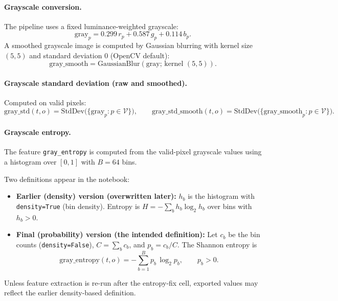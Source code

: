 \paragraph{Grayscale conversion.}
The pipeline uses a fixed luminance-weighted grayscale:
\begin{equation}
\mathrm{gray}_p = 0.299\,r_p + 0.587\,g_p + 0.114\,b_p.
\end{equation}
A smoothed grayscale image is computed by Gaussian blurring with kernel size $(5,5)$ and standard deviation $0$ (OpenCV default):
\begin{equation}
\mathrm{gray\_smooth} = \mathrm{GaussianBlur}(\mathrm{gray};\,\text{kernel }(5,5)).
\end{equation}

\paragraph{Grayscale standard deviation (raw and smoothed).}
Computed on valid pixels:
\begin{equation}
\mathrm{gray\_std}(t,o)=\mathrm{StdDev}\bigl(\{\mathrm{gray}_p: p\in\mathcal{V}\}\bigr),\qquad
\mathrm{gray\_std\_smooth}(t,o)=\mathrm{StdDev}\bigl(\{\mathrm{gray\_smooth}_p: p\in\mathcal{V}\}\bigr).
\end{equation}

\paragraph{Grayscale entropy.}
The feature \texttt{gray\_entropy} is computed from the valid-pixel grayscale values using a histogram over $[0,1]$ with $B=64$ bins.

Two definitions appear in the notebook:
\begin{itemize}[leftmargin=*, itemsep=2pt]
\item \textbf{Earlier (density) version (overwritten later):}
$h_b$ is the histogram with \texttt{density=True} (bin density). Entropy is
$H=-\sum_b h_b\log_2 h_b$ over bins with $h_b>0$.
\item \textbf{Final (probability) version (the intended definition):}
Let $c_b$ be the bin counts (\texttt{density=False}), $C=\sum_b c_b$, and $p_b=c_b/C$.
The Shannon entropy is
\begin{equation}
\mathrm{gray\_entropy}(t,o) = -\sum_{b=1}^{B} p_b\,\log_2 p_b,\qquad p_b>0.
\end{equation}
\end{itemize}
\noindent
Unless feature extraction is re-run after the entropy-fix cell, exported values may reflect the earlier density-based definition.

